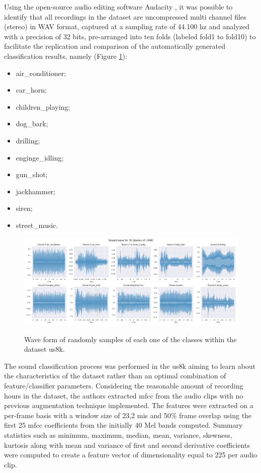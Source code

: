 Using the open-source audio editing software Audacity \cite{Audacity2024}, it was possible to identify that all recordings in the dataset are uncompressed multi channel files (stereo) in WAV format, captured at a sampling rate of 44.100 \gls{hz} and analyzed with a precision of 32 bits, pre-arranged into ten folds (labeled fold1 to fold10) to facilitate the replication and comparison of the automatically generated classification results, namely (Figure \ref{fig:methods_dataset_US8K}):
\begin{itemize}
    \item air\_conditioner;
    \item car\_horn;
    \item children\_playing; 
    \item dog\_bark; 
    \item drilling; 
    \item enginge\_idling; 
    \item gun\_shot; 
    \item jackhammer; 
    \item siren; 
    \item street\_music.
\end{itemize}

\begin{figure}[htbp]
    \raggedright
        \caption{Wave form of randomly samples of each one of the classes within the dataset \gls{us8k}.}
        \includegraphics[width=1\textwidth]{resources/images/050-methods/Methods_dataset_US8K.png}
        \label{fig:methods_dataset_US8K}
\end{figure}

The sound classification process was performed in the \gls{us8k} aiming to learn about the characteristics of the dataset rather than an optimal combination of feature/classifier parameters. Considering the reasonable amount of recording hours in the dataset, the authors extracted \gls{mfcc} from the audio clips with no previous augmentation technique implemented. The features were extracted on a per-frame basis with a window size of 23,2 \gls{mi}\gls{s} and 50\% frame overlap using the first 25 \gls{mfcc} coefficients from the initially 40 Mel bands computed. Summary statistics such as minimum, maximum, median, mean, variance, skewness, kurtosis along with mean and variance of first and second derivative coefficients were computed to create a feature vector of dimensionality equal to 225 per audio clip.


